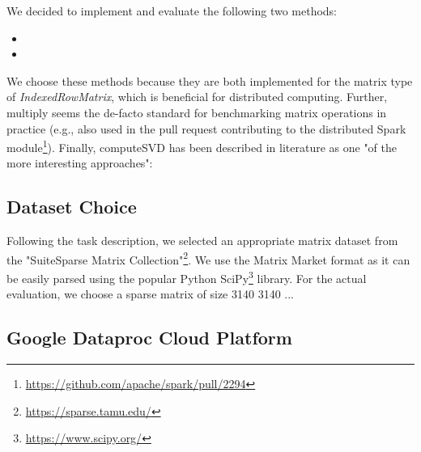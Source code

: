 \documentclass{prog_report}
\newcommand{\footurl}[1]{\footnote{\url{#1}}}
\begin{document}
We decided to implement and evaluate the following two methods:
\begin{itemize}
    \item {}
    \item {}
\end{itemize}
We choose these methods because they are both implemented for the matrix type of \emph{IndexedRowMatrix}, which is beneficial for distributed computing.
Further, multiply seems the de-facto standard for benchmarking matrix operations in practice (e.g., also used in the pull request contributing to the distributed Spark module\footurl{https://github.com/apache/spark/pull/2294}).
Finally, computeSVD has been described in literature as one "of the more interesting approaches"\cite{bosagh-zadeh:16}:

\subsection{Dataset Choice}

Following the task description, we selected an appropriate matrix dataset from the "SuiteSparse Matrix Collection"\footurl{https://sparse.tamu.edu/}.
We use the  Matrix Market format as it can be easily parsed using the popular Python SciPy\footurl{https://www.scipy.org/} library.
For the actual evaluation, we choose a sparse matrix of size 3140 3140 ... 


\subsection{Google Dataproc Cloud Platform}
\end{document}

